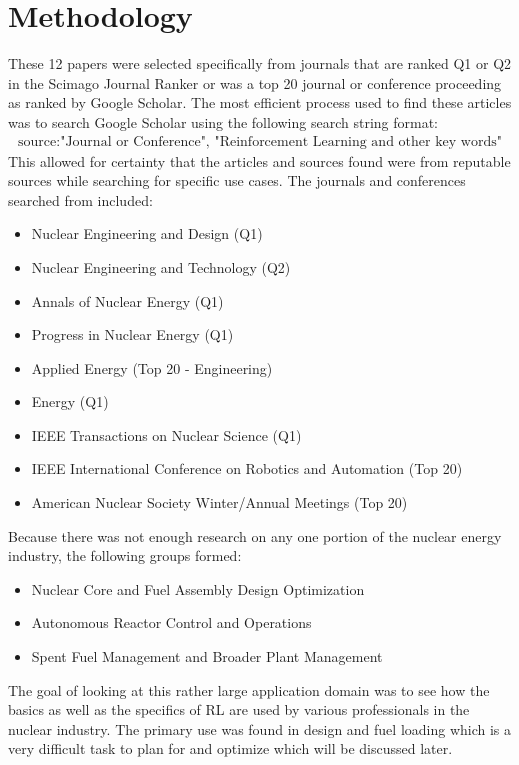 \documentclass{article}
\begin{document}
\newpage
\section{Methodology}
These 12 papers were selected specifically from journals that are ranked Q1 or Q2 in the Scimago Journal Ranker or was a top 20 journal or conference proceeding as ranked by Google Scholar. The most efficient process used to find these articles was to search Google Scholar using the following search string format:
\begin{align}
    \text{source:"Journal or Conference", "Reinforcement Learning and other key words"}
\end{align}
This allowed for certainty that the articles and sources found were from reputable sources while searching for specific use cases. The journals and conferences searched from included:
\begin{itemize}
    \item Nuclear Engineering and Design (Q1)
    \item Nuclear Engineering and Technology (Q2)
    \item Annals of Nuclear Energy (Q1)
    \item Progress in Nuclear Energy (Q1)
    \item Applied Energy (Top 20 - Engineering)
    \item Energy (Q1)
    \item IEEE Transactions on Nuclear Science (Q1)
    \item IEEE International Conference on Robotics and Automation (Top 20)
    \item American Nuclear Society Winter/Annual Meetings (Top 20)
\end{itemize}
Because there was not enough research on any one portion of the nuclear energy industry, the following groups formed:
\begin{itemize}
    \item Nuclear Core and Fuel Assembly Design Optimization 
    \item Autonomous Reactor Control and Operations 
    \item Spent Fuel Management and Broader Plant Management
\end{itemize}
The goal of looking at this rather large application domain was to see how the basics as well as the specifics of RL are used by various professionals in the nuclear industry. The primary use was found in design and fuel loading which is a very difficult task to plan for and optimize which will be discussed later. 
\end{document}
